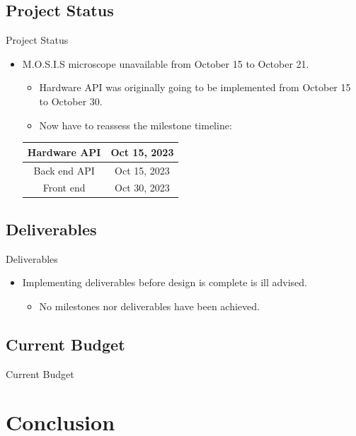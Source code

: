 \documentclass[17pt, aspectratio=169]{beamer}
\begin{document}
\subsection{Project Status}
\begin{frame}{Project Status}
	\begin{itemize}
		\item M.O.S.I.S microscope unavailable from October 15 to October 21.
		      \begin{itemize}
			      \item Hardware API was originally going to be implemented from October 15 to October 30.
			      \item Now have to reassess the milestone timeline:
		      \end{itemize}
		      \begin{center}
			      \begin{tabular}{||c | c||}
				      \hline
				      Hardware API & Oct 15, 2023 \\
				      \hline
				      Back end API & Oct 15, 2023 \\
				      \hline
				      Front end    & Oct 30, 2023 \\
				      \hline
			      \end{tabular}
		      \end{center}
	\end{itemize}
\end{frame}
\subsection{Deliverables}
\begin{frame}{Deliverables}
	\begin{itemize}
		\item Implementing deliverables before design is complete is ill advised.
		      \begin{itemize}
			      \item No milestones nor deliverables have been achieved.
		      \end{itemize}
	\end{itemize}
\end{frame}
\subsection{Current Budget}
\begin{frame}{Current Budget}

\end{frame}
\section{Conclusion}
\end{document}
